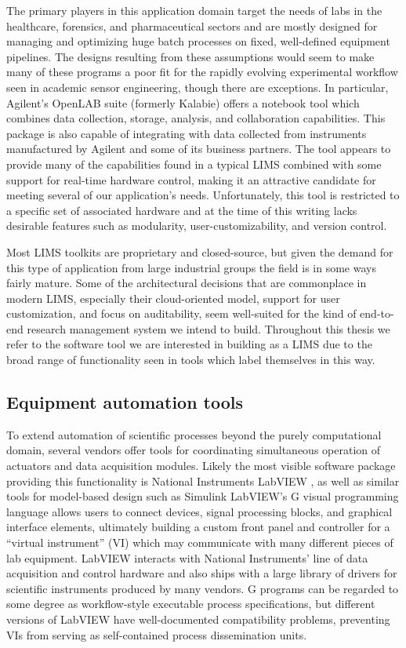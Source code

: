\documentclass[../thesis]{subfiles}
\begin{document}
The primary players in this application domain target the needs of
labs in the healthcare, forensics, and pharmaceutical sectors and are
mostly designed for managing and optimizing huge batch processes on
fixed, well-defined equipment pipelines. The designs resulting from
these assumptions would seem to make many of these programs a poor fit
for the rapidly evolving experimental workflow seen in academic sensor
engineering, though there are exceptions.
In particular, Agilent's OpenLAB suite (formerly Kalabie)
\cite{OpenLAB} offers a notebook tool which combines data collection,
storage, analysis, and collaboration capabilities. This package is
also capable of integrating with data collected from instruments
manufactured by Agilent and some of its business partners. The tool
appears to provide many of the capabilities found in a typical
\gls{LIMS} combined with some support for real-time hardware control,
making it an attractive candidate for meeting several of our
application's needs. Unfortunately, this tool is restricted to a
specific set of associated hardware and at the time of this writing
lacks desirable features such as modularity, user-customizability, and
version control.

Most \gls{LIMS} toolkits are proprietary and closed-source, but given the
demand for this type of application from large industrial groups the
field is in some ways fairly mature. Some of the architectural
decisions that are commonplace in modern \gls{LIMS}, especially their
cloud-oriented model, support for user customization, and focus on
auditability, seem well-suited
for the kind of end-to-end research management system we intend to
build. Throughout this thesis we refer to the software tool we are interested
in building as a \gls{LIMS} due to the broad range of
functionality seen in tools which label themselves in this way.

\subsection{Equipment automation tools}
To extend automation of scientific processes beyond the purely
computational domain, several vendors offer tools for coordinating
simultaneous operation of actuators and data acquisition modules.
Likely the most visible software package providing this functionality
is National Instruments LabVIEW \cite{LabVIEW}, as well as similar
tools for model-based design such as Simulink \cite{Simulink}
LabVIEW's G visual programming language allows users to connect
devices, signal processing blocks, and graphical interface elements,
ultimately building a custom front panel and controller for a
``virtual instrument'' (VI) which may communicate with many different
pieces of lab equipment. LabVIEW interacts with National Instruments'
line of data acquisition and control hardware and also ships with a
large library of drivers for scientific instruments produced by many
vendors. G programs can be regarded to some degree as workflow-style
executable process specifications, but different versions of LabVIEW
have well-documented compatibility problems, preventing VIs from
serving as self-contained process dissemination units.
\end{document}
